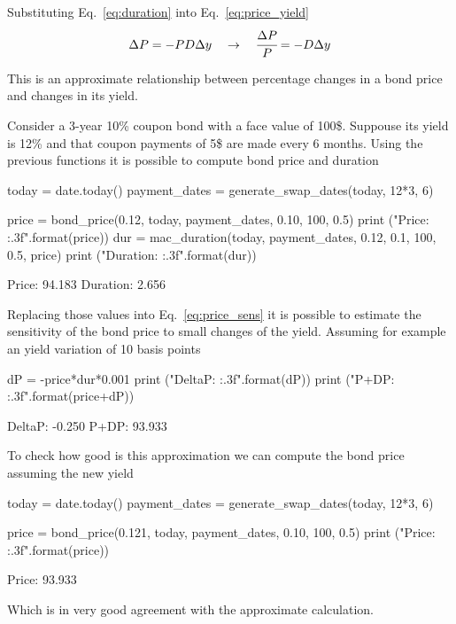 Substituting Eq.~\ref{eq:duration} into Eq.~\ref{eq:price_yield} 
\begin{equation}
\Delta P = -PD\Delta y \quad\rightarrow\quad \cfrac{\Delta P}{P} = -D\Delta y
\label{eq:price_sens}
\end{equation}

This is an approximate relationship between percentage changes in a bond price and changes in its yield.

Consider a 3-year 10\% coupon bond with a face value of 100\$. Suppouse its yield is 12\% and that coupon payments of 5\$ are made every 6 months. Using the previous functions it is possible to compute bond price and duration

\begin{ipython}
today = date.today()
payment_dates = generate_swap_dates(today, 12*3, 6)

price = bond_price(0.12, today, payment_dates, 0.10, 100, 0.5)
print ("Price: {:.3f}".format(price))
dur = mac_duration(today, payment_dates, 0.12, 0.1, 100, 0.5, price)
print ("Duration: {:.3f}".format(dur))
\end{ipython}
\begin{ioutput}
Price: 94.183
Duration: 2.656
\end{ioutput}

Replacing those values into Eq.~\ref{eq:price_sens} it is possible to estimate the sensitivity of the bond price to small changes of the yield.
Assuming for example an yield variation of 10 basis points
\begin{ipython}
dP = -price*dur*0.001
print ("DeltaP: {:.3f}".format(dP))
print ("P+DP: {:.3f}".format(price+dP))
\end{ipython}
\begin{ioutput}
DeltaP: -0.250
P+DP: 93.933
\end{ioutput}

To check how good is this approximation we can compute the bond price assuming the new yield
\begin{ipython}
today = date.today()
payment_dates = generate_swap_dates(today, 12*3, 6)

price = bond_price(0.121, today, payment_dates, 0.10, 100, 0.5)
print ("Price: {:.3f}".format(price))
\end{ipython}
\begin{ioutput}
Price: 93.933
\end{ioutput}

Which is in very good agreement with the approximate calculation.

